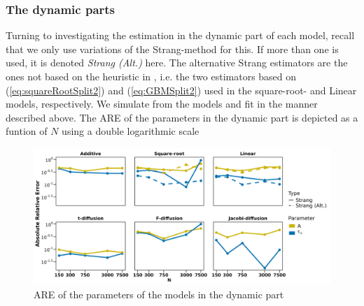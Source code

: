 \subsubsection{The dynamic parts}
Turning to investigating the estimation in the dynamic part of each model, recall that we only use variations of the Strang-method for this. If more than one is used, it is denoted \textit{Strang (Alt.)} here. The alternative Strang estimators are the ones not based on the heuristic in \cite{SplittingSchemes}, i.e. the two estimators based on (\ref{eq:squareRootSplit2}) and (\ref{eq:GBMSplit2}) used in the square-root- and Linear models, respectively. We simulate from the models and fit in the manner described above. The ARE of the parameters in the dynamic part is depicted as a funtion of $N$ using a double logarithmic scale 
\begin{figure}[h!]
    \begin{center}
    \includegraphics[scale = .1]{figures/parameter_precision_dynamic.jpeg}
    \caption{ARE of the parameters of the models in the dynamic part}
    \label{figure:parameter_precision_dynamic}        
\end{center}
\end{figure}\\
